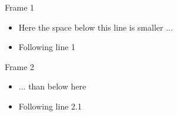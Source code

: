 \documentclass{beamer}
\begin{document}
\begin{frame}{Frame 1}
  \begin{itemize}
    \item Here the space below this line is smaller ...
    \item Following line 1
  \end{itemize}
\end{frame}

\begin{frame}{Frame 2}
  \begin{itemize}
    \item ... than below here
  \end{itemize}
  \begin{itemize}
      \item Following line 2.1
   \end{itemize}
\end{frame}
\end{document}
